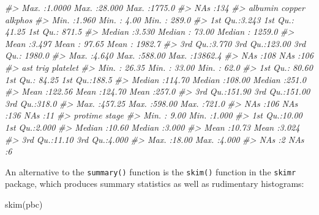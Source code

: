 \documentclass[
]{memoir}
\newenvironment{Shaded}{\begin{snugshade}}{\end{snugshade}}
\newcommand{\CommentTok}[1]{\textcolor[rgb]{0.56,0.35,0.01}{\textit{#1}}}
\newcommand{\FunctionTok}[1]{\textcolor[rgb]{0.00,0.00,0.00}{#1}}
\newcommand{\NormalTok}[1]{#1}
\begin{document}
\begin{Shaded}
\begin{Highlighting}[]
\CommentTok{\#\textgreater{}  Max.   :1.0000   Max.   :28.000   Max.   :1775.0  }
\CommentTok{\#\textgreater{}                                    NA\textquotesingle{}s   :134     }
\CommentTok{\#\textgreater{}     albumin          copper          alkphos       }
\CommentTok{\#\textgreater{}  Min.   :1.960   Min.   :  4.00   Min.   :  289.0  }
\CommentTok{\#\textgreater{}  1st Qu.:3.243   1st Qu.: 41.25   1st Qu.:  871.5  }
\CommentTok{\#\textgreater{}  Median :3.530   Median : 73.00   Median : 1259.0  }
\CommentTok{\#\textgreater{}  Mean   :3.497   Mean   : 97.65   Mean   : 1982.7  }
\CommentTok{\#\textgreater{}  3rd Qu.:3.770   3rd Qu.:123.00   3rd Qu.: 1980.0  }
\CommentTok{\#\textgreater{}  Max.   :4.640   Max.   :588.00   Max.   :13862.4  }
\CommentTok{\#\textgreater{}                  NA\textquotesingle{}s   :108      NA\textquotesingle{}s   :106      }
\CommentTok{\#\textgreater{}       ast              trig           platelet    }
\CommentTok{\#\textgreater{}  Min.   : 26.35   Min.   : 33.00   Min.   : 62.0  }
\CommentTok{\#\textgreater{}  1st Qu.: 80.60   1st Qu.: 84.25   1st Qu.:188.5  }
\CommentTok{\#\textgreater{}  Median :114.70   Median :108.00   Median :251.0  }
\CommentTok{\#\textgreater{}  Mean   :122.56   Mean   :124.70   Mean   :257.0  }
\CommentTok{\#\textgreater{}  3rd Qu.:151.90   3rd Qu.:151.00   3rd Qu.:318.0  }
\CommentTok{\#\textgreater{}  Max.   :457.25   Max.   :598.00   Max.   :721.0  }
\CommentTok{\#\textgreater{}  NA\textquotesingle{}s   :106      NA\textquotesingle{}s   :136      NA\textquotesingle{}s   :11     }
\CommentTok{\#\textgreater{}     protime          stage      }
\CommentTok{\#\textgreater{}  Min.   : 9.00   Min.   :1.000  }
\CommentTok{\#\textgreater{}  1st Qu.:10.00   1st Qu.:2.000  }
\CommentTok{\#\textgreater{}  Median :10.60   Median :3.000  }
\CommentTok{\#\textgreater{}  Mean   :10.73   Mean   :3.024  }
\CommentTok{\#\textgreater{}  3rd Qu.:11.10   3rd Qu.:4.000  }
\CommentTok{\#\textgreater{}  Max.   :18.00   Max.   :4.000  }
\CommentTok{\#\textgreater{}  NA\textquotesingle{}s   :2       NA\textquotesingle{}s   :6}
\end{Highlighting}
\end{Shaded}

An alternative to the \texttt{summary()} function is the \texttt{skim()} function in the \texttt{skimr} package, which produces summary statistics as well as rudimentary histograms:

\begin{Shaded}
\begin{Highlighting}[]
\FunctionTok{skim}\NormalTok{(pbc)}
\end{Highlighting}
\end{Shaded}
\end{document}
